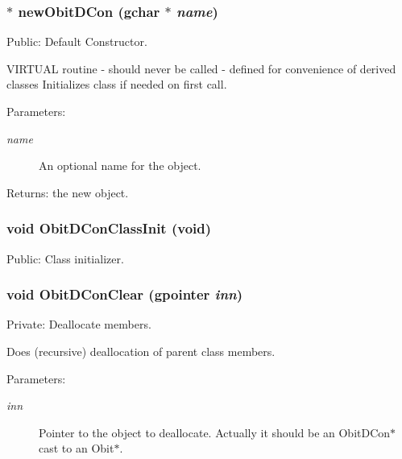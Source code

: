 \subsubsection{$\ast$ new\-Obit\-DCon (gchar $\ast$ {\em name})}\label{ObitDCon_8c_a6}


Public: Default Constructor. 

VIRTUAL routine - should never be called - defined for convenience of derived classes Initializes class if needed on first call. \begin{Desc}
\item[Parameters:]
\begin{description}
\item[{\em name}]An optional name for the object. \end{description}
\end{Desc}
\begin{Desc}
\item[Returns:]the new object. \end{Desc}
\subsubsection{\setlength{\rightskip}{0pt plus 5cm}void Obit\-DCon\-Class\-Init (void)}\label{ObitDCon_8c_a13}


Public: Class initializer. 

\subsubsection{\setlength{\rightskip}{0pt plus 5cm}void Obit\-DCon\-Clear (gpointer {\em inn})}\label{ObitDCon_8c_a4}


Private: Deallocate members. 

Does (recursive) deallocation of parent class members. \begin{Desc}
\item[Parameters:]
\begin{description}
\item[{\em inn}]Pointer to the object to deallocate. Actually it should be an Obit\-DCon$\ast$ cast to an Obit$\ast$. \end{description}
\end{Desc}
